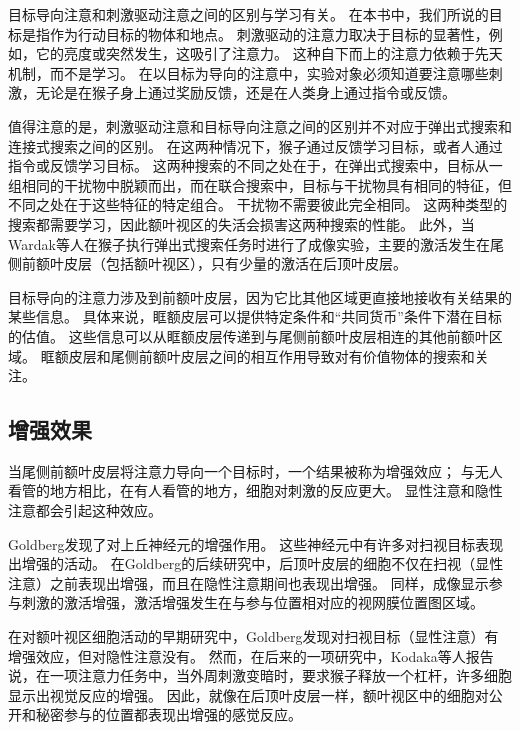 目标导向注意和刺激驱动注意之间的区别与学习有关。
在本书中，我们所说的目标是指作为行动目标的物体和地点。
刺激驱动的注意力取决于目标的显著性，例如，它的亮度或突然发生，这吸引了注意力。
这种自下而上的注意力依赖于先天机制，而不是学习。
在以目标为导向的注意中，实验对象必须知道要注意哪些刺激，无论是在猴子身上通过奖励反馈，还是在人类身上通过指令或反馈。


值得注意的是，刺激驱动注意和目标导向注意之间的区别并不对应于弹出式搜索和连接式搜索之间的区别。
在这两种情况下，猴子通过反馈学习目标，或者人通过指令或反馈学习目标。
这两种搜索的不同之处在于，在弹出式搜索中，目标从一组相同的干扰物中脱颖而出，而在联合搜索中，目标与干扰物具有相同的特征，但不同之处在于这些特征的特定组合。
干扰物不需要彼此完全相同。
这两种类型的搜索都需要学习，因此额叶视区的失活会损害这两种搜索的性能\cite{wardak2004deficit}。
此外，当Wardak等人\cite{wardak2010searching}在猴子执行弹出式搜索任务时进行了成像实验，主要的激活发生在尾侧前额叶皮层（包括额叶视区），只有少量的激活在后顶叶皮层。


目标导向的注意力涉及到前额叶皮层，因为它比其他区域更直接地接收有关结果的某些信息。
具体来说，眶额皮层可以提供特定条件和“共同货币”条件下潜在目标的估值。
这些信息可以从眶额皮层传递到与尾侧前额叶皮层相连的其他前额叶区域。
眶额皮层和尾侧前额叶皮层之间的相互作用导致对有价值物体的搜索和关注。



\subsection{增强效果}

当尾侧前额叶皮层将注意力导向一个目标时，一个结果被称为增强效应；
与无人看管的地方相比，在有人看管的地方，细胞对刺激的反应更大。
显性注意和隐性注意都会引起这种效应。


Goldberg\cite{goldberg1972activity}发现了对上丘神经元的增强作用。
这些神经元中有许多对扫视目标表现出增强的活动。
在Goldberg\cite{goldberg1981behavioral}的后续研究中，后顶叶皮层的细胞不仅在扫视（显性注意）之前表现出增强，而且在隐性注意期间也表现出增强。
同样，成像显示参与刺激的激活增强\cite{corbetta2000voluntary}，激活增强发生在与参与位置相对应的视网膜位置图区域\cite{brefczynski1999physiological}。


在对额叶视区细胞活动的早期研究中，Goldberg\cite{goldberg1985cerebral}发现对扫视目标（显性注意）有增强效应，但对隐性注意没有。
然而，在后来的一项研究中，Kodaka等人\cite{kodaka1997neuronal}报告说，在一项注意力任务中，当外周刺激变暗时，要求猴子释放一个杠杆，许多细胞显示出视觉反应的增强。
因此，就像在后顶叶皮层一样，额叶视区中的细胞对公开和秘密参与的位置都表现出增强的感觉反应。



